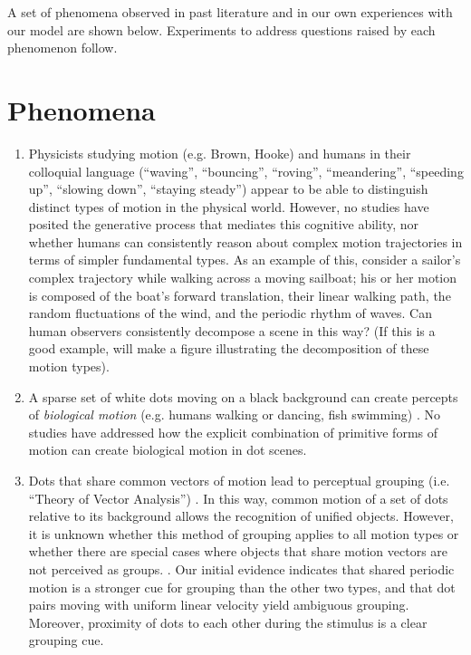 \documentclass{scrartcl}
\begin{document}
A set of phenomena observed in past literature and in our own experiences with our model are shown below. Experiments to address questions raised by each phenomenon follow.

\section{Phenomena} \label{Phenomena}

\begin{enumerate}
  \item \label{motion_alone_phen}
  Physicists studying motion (e.g. Brown, Hooke) and humans in their colloquial language (``waving'', ``bouncing'', ``roving'', ``meandering'', ``speeding up'', ``slowing down'', ``staying steady'') appear to be able to distinguish distinct types of motion in the physical world. However, no studies have posited the generative process that mediates this cognitive ability, nor whether humans can consistently reason about complex motion trajectories in terms of simpler fundamental types. As an example of this, consider a sailor's complex trajectory while walking across a moving sailboat; his or her motion is composed of the boat's forward translation, their linear walking path, the random fluctuations of the wind, and the periodic rhythm of waves. Can human observers consistently decompose a scene in this way? (If this is a good example, will make a figure illustrating the decomposition of these motion types). 
  \item \label{biomotion_phen} A sparse set of white dots moving on a black background can create percepts of \emph{biological motion} (e.g. humans walking or dancing, fish swimming) \cite{Johansson_1973}. No studies have addressed how the explicit combination of primitive forms of motion can create biological motion in dot scenes.  
  \item Dots that share common vectors of motion lead to perceptual grouping (i.e. ``Theory of Vector Analysis'') \cite{Johansson_1973}. In this way, common motion of a set of dots relative to its background allows the recognition of unified objects. However, it is unknown whether this method of grouping applies to all motion types or whether there are special cases where objects that share motion vectors are not perceived as groups. \label{common_motion_phen}. Our initial evidence indicates that shared periodic motion is a stronger cue for grouping than the other two types, and that dot pairs moving with uniform linear velocity yield ambiguous grouping. Moreover, proximity of dots to each other during the stimulus is a clear grouping cue. 
\end{enumerate}
\end{document}
